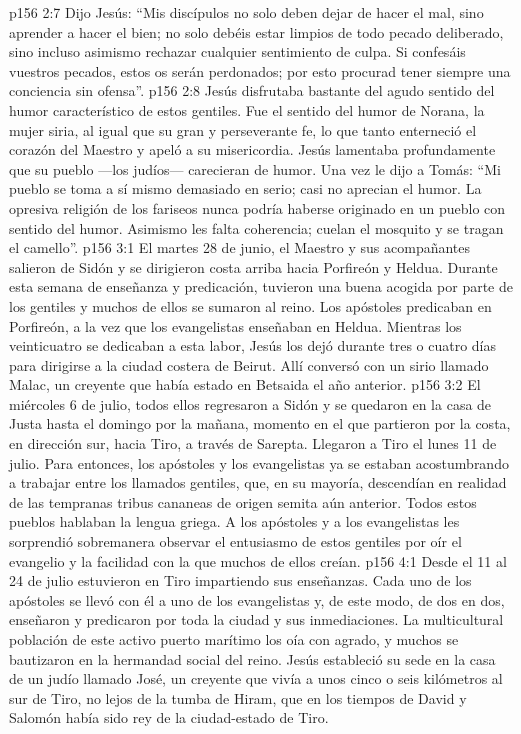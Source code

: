 \vs p156 2:7 Dijo Jesús: “Mis discípulos no solo deben dejar de hacer el mal, sino aprender a hacer el bien; no solo debéis estar limpios de todo pecado deliberado, sino incluso asimismo rechazar cualquier sentimiento de culpa. Si confesáis vuestros pecados, estos os serán perdonados; por esto procurad tener siempre una conciencia sin ofensa”.
\vs p156 2:8 Jesús disfrutaba bastante del agudo sentido del humor característico de estos gentiles. Fue el sentido del humor de Norana, la mujer siria, al igual que su gran y perseverante fe, lo que tanto enterneció el corazón del Maestro y apeló a su misericordia. Jesús lamentaba profundamente que su pueblo ---los judíos--- carecieran de humor. Una vez le dijo a Tomás: “Mi pueblo se toma a sí mismo demasiado en serio; casi no aprecian el humor. La opresiva religión de los fariseos nunca podría haberse originado en un pueblo con sentido del humor. Asimismo les falta coherencia; cuelan el mosquito y se tragan el camello”.
\vs p156 3:1 El martes 28 de junio, el Maestro y sus acompañantes salieron de Sidón y se dirigieron costa arriba hacia Porfireón y Heldua. Durante esta semana de enseñanza y predicación, tuvieron una buena acogida por parte de los gentiles y muchos de ellos se sumaron al reino. Los apóstoles predicaban en Porfireón, a la vez que los evangelistas enseñaban en Heldua. Mientras los veinticuatro se dedicaban a esta labor, Jesús los dejó durante tres o cuatro días para dirigirse a la ciudad costera de Beirut. Allí conversó con un sirio llamado Malac, un creyente que había estado en Betsaida el año anterior.
\vs p156 3:2 El miércoles 6 de julio, todos ellos regresaron a Sidón y se quedaron en la casa de Justa hasta el domingo por la mañana, momento en el que partieron por la costa, en dirección sur, hacia Tiro, a través de Sarepta. Llegaron a Tiro el lunes 11 de julio. Para entonces, los apóstoles y los evangelistas ya se estaban acostumbrando a trabajar entre los llamados gentiles, que, en su mayoría, descendían en realidad de las tempranas tribus cananeas de origen semita aún anterior. Todos estos pueblos hablaban la lengua griega. A los apóstoles y a los evangelistas les sorprendió sobremanera observar el entusiasmo de estos gentiles por oír el evangelio y la facilidad con la que muchos de ellos creían.
\vs p156 4:1 Desde el 11 al 24 de julio estuvieron en Tiro impartiendo sus enseñanzas. Cada uno de los apóstoles se llevó con él a uno de los evangelistas y, de este modo, de dos en dos, enseñaron y predicaron por toda la ciudad y sus inmediaciones. La multicultural población de este activo puerto marítimo los oía con agrado, y muchos se bautizaron en la hermandad social del reino. Jesús estableció su sede en la casa de un judío llamado José, un creyente que vivía a unos cinco o seis kilómetros al sur de Tiro, no lejos de la tumba de Hiram, que en los tiempos de David y Salomón había sido rey de la ciudad\hyp{}estado de Tiro.
